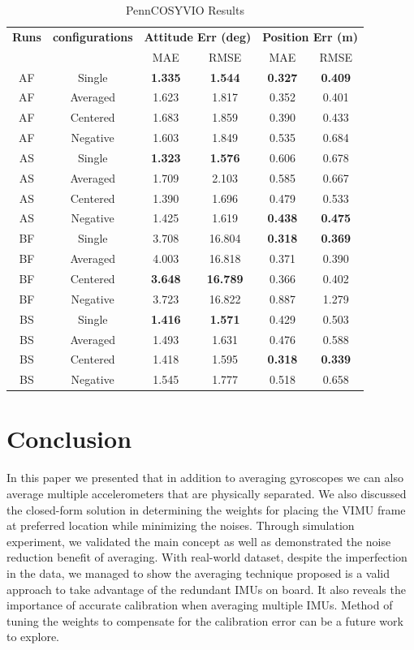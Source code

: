 \documentclass[conference]{IEEEtran}
\begin{document}
\begin{table}[h!]
\centering
\caption{PennCOSYVIO Results}
\label{tab:vio_result}
\begin{tabular}{cccccc}
\toprule
\textbf{Runs} & \textbf{configurations} & \multicolumn{2}{c}{\textbf{Attitude Err (deg)}} & \multicolumn{2}{c}{\textbf{Position Err (m)}} \\
\cmidrule(lr){3-4} \cmidrule(lr){5-6}
 & & MAE & RMSE & MAE & RMSE \\
\midrule
AF & Single   & \textbf{1.335} & \textbf{1.544} & \textbf{0.327} & \textbf{0.409} \\
AF & Averaged & 1.623 & 1.817 & 0.352 & 0.401 \\
AF & Centered & 1.683 & 1.859 & 0.390 & 0.433 \\
AF & Negative & 1.603 & 1.849 & 0.535 & 0.684 \\
\midrule
AS & Single   & \textbf{1.323} & \textbf{1.576} & 0.606 & 0.678 \\
AS & Averaged & 1.709 & 2.103 & 0.585 & 0.667 \\
AS & Centered & 1.390 & 1.696 & 0.479 & 0.533 \\
AS & Negative & 1.425 & 1.619 & \textbf{0.438} & \textbf{0.475} \\
\midrule
BF & Single   & 3.708 & 16.804 & \textbf{0.318} & \textbf{0.369} \\
BF & Averaged & 4.003 & 16.818 & 0.371 & 0.390 \\
BF & Centered & \textbf{3.648} & \textbf{16.789} & 0.366 & 0.402 \\
BF & Negative & 3.723 & 16.822 & 0.887 & 1.279 \\
\midrule
BS & Single   & \textbf{1.416} & \textbf{1.571} & 0.429 & 0.503 \\
BS & Averaged & 1.493 & 1.631 & 0.476 & 0.588 \\
BS & Centered & 1.418 & 1.595 & \textbf{0.318} & \textbf{0.339} \\
BS & Negative & 1.545 & 1.777 & 0.518 & 0.658 \\
\bottomrule
\end{tabular}
\end{table}

\section{Conclusion}

In this paper we presented that in addition to averaging gyroscopes we can also average multiple accelerometers that are physically separated. We also discussed the closed-form solution in determining the weights for placing the VIMU frame at preferred location while minimizing the noises. Through simulation experiment, we validated the main concept as well as demonstrated the noise reduction benefit of averaging. With real-world dataset, despite the imperfection in the data, we managed to show the averaging technique proposed is a valid approach to take advantage of the redundant IMUs on board. It also reveals the importance of accurate calibration when averaging multiple IMUs. Method of tuning the weights to compensate for the calibration error can be a future work to explore.



\end{document}
